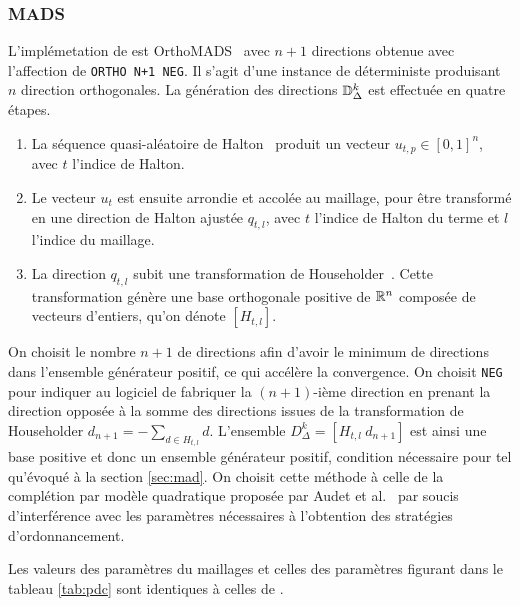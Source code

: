 \subsubsection{MADS}\label{sec:nma}
L'implémetation de \MADS est \textsf{OrthoMADS}~\cite{AbAuDeLe09} avec $n+1$ directions obtenue avec l'affection de \texttt{ORTHO N+1 NEG}. Il s'agit d'une instance de \MADS déterministe produisant $n$ direction orthogonales. La génération des directions $\mathbb{D}_\Delta^k$ est effectuée en quatre étapes.
\begin{enumerate}[label=\roman*.]
\item La séquence quasi-aléatoire de Halton~\cite{Ha60} produit un vecteur $u_{t,p} \in [0,1]^n$, avec $t$ l'indice de Halton.
\item Le vecteur $u_{t}$ est ensuite arrondie et accolée au maillage, pour être transformé en une direction de Halton ajustée $q_{t,l}$, avec $t$ l'indice de Halton du terme et $l$ l'indice du maillage.
\item La direction $q_{t,l}$ subit une transformation de Householder~\cite{Ho58}. Cette transformation génère une base orthogonale positive de $\mathbb{R}^n$ composée de vecteurs d'entiers, qu'on dénote $[H_{t,l}]$.
\end{enumerate}
On choisit le nombre $n+1$ de directions afin d'avoir le minimum de directions dans l'ensemble générateur positif, ce qui accélère la convergence. On choisit \texttt{NEG} pour indiquer au logiciel de fabriquer la $(n+1)$-ième direction en prenant la direction opposée à la somme des directions issues de la transformation de Householder $d_{n+1}=-\sum_{d\in H_{t,l}}d$. L'ensemble $D^k_\Delta = [H_{t,l}~d_{n+1}]$ est ainsi une base positive et donc un ensemble générateur positif, condition nécessaire pour \MADS tel qu'évoqué à la section \ref{sec:mad}. On choisit cette méthode à celle de la complétion par modèle quadratique proposée par Audet et al.~\cite{AuIaLeDTr2014} par soucis d'interférence avec les paramètres nécessaires à l'obtention des stratégies d'ordonnancement. 

Les valeurs des paramètres du maillages et celles des paramètres figurant dans le tableau \ref{tab:pdc} sont identiques à celles de \GPS.
